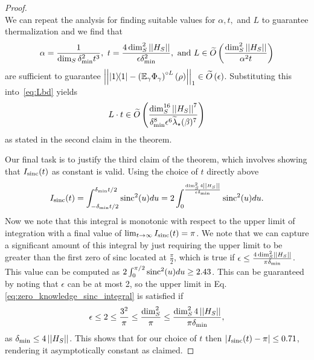 \begin{proof}
\begin{equation}
    \end{equation}
    We can repeat the analysis for finding suitable values for $\alpha, t, $ and $L$ to guarantee thermalization and we find that 
    \begin{equation}
        \alpha = \frac{1}{\dim_S \delta_{\min}^2 t^3}, ~ t = \frac{4 \dim_S^2 \left| \left| H_S \right| \right|}{\epsilon \delta_{\min}^2}, \text{ and } L \in \widetilde{O} \left( \frac{\dim_S^2 \left| \left| H_S \right| \right|}{\alpha^2 t} \right)
    \end{equation}
    are sufficient to guarantee $\left| \left| | 1\rangle\! \langle 1| - \left( \mathbb{E}_\gamma \Phi_\gamma\right)^{\circ L} (\rho) \right| \right|_1 \in \widetilde{O} \left( \epsilon \right)$.  Substituting this into~\eqref{eq:Lbd} yields
    \begin{equation}
        L\cdot t \in \widetilde{O} \left( \frac{\dim_S^{16} \left| \left| H_S \right| \right|^7}{\delta_{\min}^8 \epsilon^6 \widetilde{\lambda}_\star(\beta)^7} \right)
    \end{equation}
    as stated in the second claim in the theorem.

    Our final task is to justify the third claim of the theorem, which involves showing that $I_{\operatorname{sinc}}(t)$ as constant is valid. Using the choice of $t$ directly above
    \begin{align}
        I_{\operatorname{sinc}}(t) = \int_{-\delta_{\min} t /2}^{\delta_{\min} t /2}  \operatorname{sinc}^2(u) du = 2 \int_{0}^{ \frac{\dim_S^2 4 \left| \left| H_S \right| \right|} {\epsilon \delta_{\min}}} \operatorname{sinc}^2(u) du. \label{eq:zero_knowledge_sinc_integral}
    \end{align}
    Now we note that this integral is monotonic with respect to the upper limit of integration with a final value of $\lim_{t \to \infty} I_{\operatorname{sinc}}(t) = \pi$. We note that we can capture a significant amount of this integral by just requiring the upper limit to be greater than the first zero of sinc located at $\frac{\pi}{2}$, which is true if $\epsilon \le \frac{4 \dim_S^2 \left| \left| H_S \right| \right|}{\pi \delta_{\min}}$. This value can be computed as $2 \int_0^{\pi / 2} \operatorname{sinc}^2(u) du \ge 2.43$. This can be guaranteed by noting that $\epsilon$ can be at most 2, so the upper limit in Eq. \eqref{eq:zero_knowledge_sinc_integral} is satisfied if
    \begin{align}
    \epsilon \le 2 \le \frac{3^2}{\pi} \le \frac{\dim_S^2}{\pi} \le \frac{\dim_S^2 4 \left| \left| H_S \right| \right|}{\pi \delta_{\min}},
\end{align}
as $\delta_{\min} \le 4 \left| \left| H_S \right| \right|$. This shows that for our choice of $t$ then $|I_{\operatorname{sinc}}(t) - \pi| \le 0.71$, rendering it asymptotically constant as claimed.
\end{proof}

